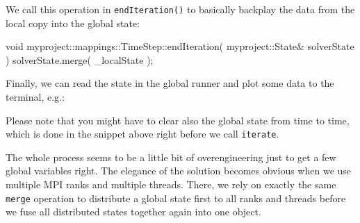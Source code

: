 \noindent
We call this operation in \texttt{endIteration()} to basically backplay the data
from the local copy into the global state:
\begin{code}
void myproject::mappings::TimeStep::endIteration(
  myproject::State&  solverState
) {
  solverState.merge( _localState );
}
\end{code}

\noindent
Finally, we can read the state in the global runner and plot some data to the
terminal, e.g.:

\noindent
Please note that you might have to clear also the global state from time to
time, which is done in the snippet above right before we call \texttt{iterate}.

\begin{remark}
  The whole process seems to be a little bit of overengineering just to get a
  few global variables right. The elegance of the solution becomes obvious when
  we use multiple MPI ranks and multiple threads. There, we rely on exactly the
  same \texttt{merge} operation to distribute a global state first to all ranks
  and threads before we fuse all distributed states together again into one
  object. 
\end{remark}
